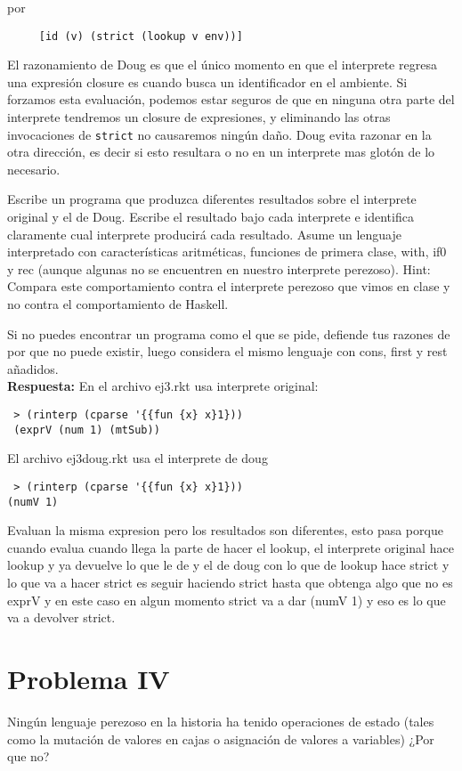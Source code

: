 \documentclass{article}
\begin{document}
por

\begin{verbatim}
     [id (v) (strict (lookup v env))]
\end{verbatim}

El razonamiento de Doug es que el único momento en que el interprete regresa una
expresión closure es cuando busca un identificador en el ambiente. Si forzamos
esta evaluación, podemos estar seguros de que en ninguna otra parte del interprete
tendremos un closure de expresiones, y eliminando las otras invocaciones de
\texttt{strict} no causaremos ningún daño. Doug evita razonar en la otra dirección,
es decir si esto resultara o no en un interprete mas glotón de lo necesario.

Escribe un programa que produzca diferentes resultados sobre el interprete original
y el de Doug. Escribe el resultado bajo cada interprete e identifica claramente
cual interprete producirá cada resultado. Asume un lenguaje interpretado
con características aritméticas, funciones de primera clase, with, if0 y rec
(aunque algunas no se encuentren en nuestro interprete perezoso). Hint: Compara
este comportamiento contra el interprete perezoso que vimos en clase y no contra
el comportamiento de Haskell.

Si no puedes encontrar un programa como el que se pide, defiende tus razones
de por que no puede existir, luego considera el mismo lenguaje con cons, first
y rest añadidos.
\\

\textbf{Respuesta: }
En el archivo ej3.rkt usa interprete original:
\begin{verbatim}
 > (rinterp (cparse '{{fun {x} x}1}))
 (exprV (num 1) (mtSub))
\end{verbatim}
El archivo ej3doug.rkt usa el interprete de doug
\begin{verbatim}
 > (rinterp (cparse '{{fun {x} x}1}))
(numV 1)
\end{verbatim}
Evaluan la misma expresion pero los resultados son diferentes, esto pasa porque cuando 
evalua cuando llega la parte de hacer el lookup, el interprete original hace lookup y
ya devuelve lo que le de y el de doug con lo que de lookup hace strict y lo que va a hacer
strict es seguir haciendo strict hasta que obtenga algo que no es exprV y en este caso
en algun momento strict va a dar (numV 1) y eso es lo que va a devolver strict. 


\section*{Problema IV}
Ningún lenguaje perezoso en la historia ha tenido operaciones de estado (tales
como la mutación de valores en cajas o asignación de valores a variables) ¿Por
que no?
\end{document}

